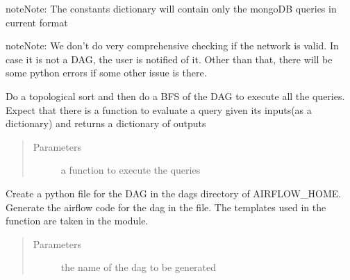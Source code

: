 \documentclass[letterpaper,10pt,english]{sphinxmanual}
\begin{document}
\begin{fulllineitems}
\begin{itemize}
\end{itemize}

\begin{sphinxadmonition}{note}{Note:}
The constants dictionary will contain only the mongoDB queries in current format
\end{sphinxadmonition}

\begin{sphinxadmonition}{note}{Note:}
We don’t do very comprehensive checking if the network is valid.
In case it is not a DAG, the user is notified of it. Other than that, there will be some python errors if some other issue is there.
\end{sphinxadmonition}

\begin{fulllineitems}
\label{\detokenize{dag:create_dag.DAG.feed_forward}}
Do a topological sort and then do a BFS of the DAG to execute all the queries.
Expect that there is a function to evaluate a query given its inputs(as a dictionary) and returns a dictionary of outputs
\begin{quote}\begin{description}
\item[{Parameters}] \leavevmode
{} \textendash{} a function to execute the queries

\end{description}\end{quote}

\end{fulllineitems}


\begin{fulllineitems}
\label{\detokenize{dag:create_dag.DAG.generate_dag}}
Create a python file for the DAG in the dags directory of AIRFLOW\_HOME. Generate the airflow code for
the dag in the file. The templates used in the function are taken in the {\hyperref[\detokenize{dag:module-create_dag}]{}} module.
\begin{quote}\begin{description}
\item[{Parameters}] \leavevmode
{} \textendash{} the name of the dag to be generated


\end{description}
\end{quote}
\end{fulllineitems}
\end{fulllineitems}
\end{document}
